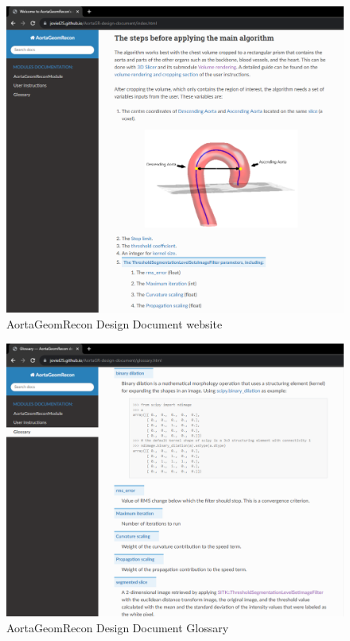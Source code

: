 \begin{figure}[H]
    \centering
    \includegraphics[width=\textwidth]{figures/AC/DD/Main_page.png}
    \caption[AortaGeomRecon Design Document website]{AortaGeomRecon Design Document website}
    \label{fig_agr_dd}
\end{figure}

\begin{figure}[H]
    \centering
    \includegraphics[width=\textwidth]{figures/AC/DD/Glossary.png}
    \caption[AortaGeomRecon Design Document Glossary]{AortaGeomRecon Design Document Glossary}
    \label{fig_agr_dd_glossary}
\end{figure}

